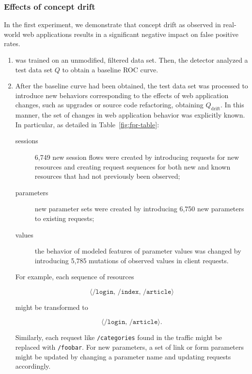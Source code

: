 \subsubsection{Effects of concept drift}
\label{web:conceptdrift:eval:effects}
In the first experiment, we demonstrate that concept drift as observed in real-world web applications results in a significant negative impact on false positive rates.

\begin{enumerate}
\item \webanomaly was trained on an unmodified, filtered data set.  Then, the detector analyzed a test data set $Q$ to obtain a baseline \ac{ROC} curve.

\item After the baseline curve had been obtained, the test data set was processed to introduce new behaviors corresponding to the effects of web application changes, such as upgrades or source code refactoring, obtaining $Q_{\text{drift}}$.  In this manner, the set of changes in web application behavior was explicitly known.  In particular, as detailed in Table~\ref{fig:fpr-table}:

\begin{description}
  \item [sessions] 6,749 new session flows were created by introducing requests for new resources and creating request sequences for both new and known resources that had not previously been observed;
  \item [parameters] new parameter sets were created by introducing 6,750 new parameters to existing requests;
  \item [values] the behavior of modeled features of parameter values was changed by introducing 5,785 mutations of observed values in client requests.
\end{description}

\noindent For example, each sequence of resources

\begin{displaymath}
  \langle\texttt{/login, /index, /article}\rangle
\end{displaymath}

might be transformed to

\begin{displaymath}
  \langle\texttt{/login, /article}\rangle.
\end{displaymath}

\noindent Similarly, each request like \texttt{/categories} found in the traffic might be replaced with \texttt{/foobar}.  For new parameters, a set of link or form parameters might be updated by changing a parameter name and updating requests accordingly.


\end{enumerate}
